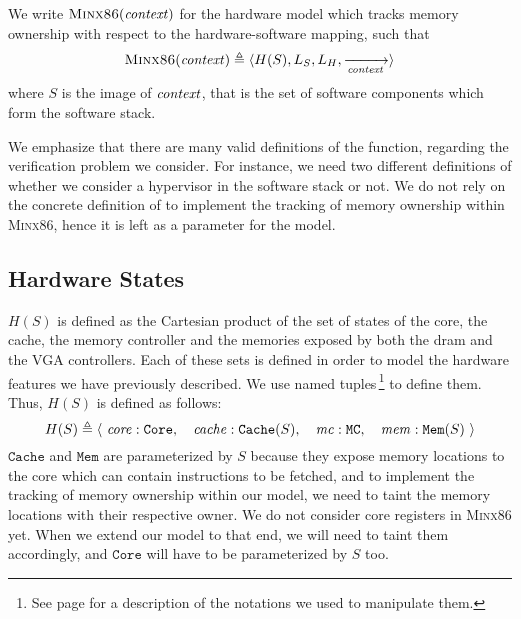 \begin{definition}
  \label{def:speccert2:minx86}
  We write $\textsc{Minx86}(\mathit{context})$ for the hardware model which
  tracks memory ownership with respect to the  hardware-software
  mapping, such that
%
  \[
    \textsc{Minx86}(\mathit{context}) \triangleq \langle H(S), L_S, L_H,
    \xrightarrow[\mathit{context}]{} \rangle
  \]
  where $S$ is the image of $\mathit{context}$, that is the set of software
  components which form the software stack.
\end{definition}

We emphasize that there are many valid definitions of the  function,
regarding the verification problem we consider.
%
For instance, we need two different definitions of  whether we
consider a hypervisor in the software stack or not.
%
We do not rely on the concrete definition of  to implement the
tracking of memory ownership within {\scshape Minx86}, hence it is left as a
parameter for the model.

\subsection{Hardware States}
\label{subsec:speccert2:state}

$H(S)$ is defined as the Cartesian product of the set of states of the core, the
cache, the memory controller and the memories exposed by both the \ac{dram}
and the VGA controllers.
%
Each of these sets is defined in order to model the hardware features we have
previously described.
%
We use named tuples\,\footnote{See page \pageref{frontmatter:notations} for a
  description of the notations we used to manipulate them.} to
define them.
%
Thus, $H(S)$ is defined as follows:
%
\[
  H(S) \triangleq \left<\ \mathit{core}: \mathtt{Core},\quad\mathit{cache}:
    \mathtt{Cache}(S),\quad\mathit{mc}: \mathtt{MC},\quad\mathit{mem}:
    \mathtt{Mem}(S) \ \right>
\]
%
\( \mathtt{Cache} \) and \( \mathtt{Mem} \) are parameterized by \( S \) because
they expose memory locations to the core which can contain instructions to be
fetched, and to implement the tracking of memory ownership within our model, we
need to taint the memory locations with their respective owner.
%
We do not consider core registers in {\scshape Minx86} yet.
%
When we extend our model to that end, we will need to taint them accordingly,
and \( \mathtt{Core} \) will have to be parameterized by \( S \) too.

